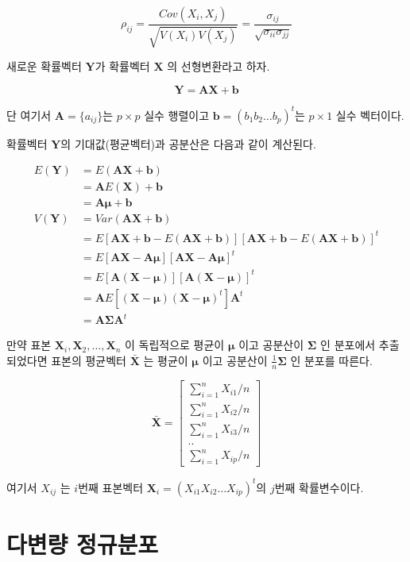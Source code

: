 \documentclass[
  11pt,
  a4paper,
  oneside]{scrbook}
\theoremstyle{definition}
\theoremstyle{plain}
\theoremstyle{definition}
\theoremstyle{definition}
\theoremstyle{remark}
\begin{document}
\[ \rho_{ij} = \frac{Cov(X_i, X_j)}{ \sqrt{V(X_i) V(X_j)}} = \frac{\sigma_{ij}}{\sqrt{\sigma_{ii}
  \sigma_{jj}}} \]

새로운 확률벡터 \(\pmb Y\)가 확률벡터 \(\pmb X\) 의 선형변환라고 하자.

\[ \pmb Y = \pmb A  \pmb X + \pmb b \]

단 여기서 \(\pmb A = \{ a_{ij} \}\)는 \(p \times p\) 실수 행렬이고
\(\pmb b =(b_1 b_2 \dots b_p)^t\)는 \(p \times 1\) 실수 벡터이다.

확률벡터 \(\pmb Y\)의 기대값(평균벡터)과 공분산은 다음과 같이 계산된다.

\[
\begin{align}
E(\pmb Y ) &= E(\pmb A \pmb X+ \pmb b) \\
&= \pmb A E(\pmb X)+ \pmb b \\
&= \pmb A \pmb \mu+ \pmb b \\
V(\pmb Y) &= Var(\pmb A \pmb X+ \pmb b) \\
&= E[\pmb A \pmb X+ \pmb b -E(\pmb A \pmb X+ \pmb b)] [\pmb A \pmb X+ \pmb b -E(\pmb A \pmb X+ \pmb b)]^t \\
&= E[\pmb A \pmb X -  \pmb A \pmb \mu] [\pmb A \pmb X -  \pmb A \pmb \mu]^t \\
&= E[\pmb A (\pmb X - \pmb \mu)] [\pmb A (\pmb X - \pmb \mu)]^t \\
&= \pmb A E [(\pmb X - \pmb \mu) (\pmb X - \pmb \mu)^t] \pmb A^t \\
&= \pmb A \pmb \Sigma \pmb A^t
\end{align}
\]

만약 표본 \(\pmb X_i, \pmb X_2, \dots, \pmb X_n\) 이 독립적으로 평균이
\(\pmb \mu\) 이고 공분산이 \(\pmb \Sigma\) 인 분포에서 추출되었다면
표본의 평균벡터 \(\bar {\pmb  X}\) 는 평균이 \(\pmb \mu\) 이고 공분산이
\(\frac{1}{n}\pmb \Sigma\) 인 분포를 따른다.

\[
\bar {\pmb X} =
  \begin{bmatrix}
\sum_{i=1}^n X_{i1} / n  \\
\sum_{i=1}^n X_{i2} / n \\
\sum_{i=1}^n X_{i3} / n \\
..  \\
\sum_{i=1}^n X_{ip} / n 
\end{bmatrix}
\]

여기서 \(X_{ij}\) 는 \(i\)번째 표본벡터
\(\pmb X_i =(X_{i1} X_{i2} \dots X_{ip})^t\)의 \(j\)번째 확률변수이다.

\section{다변량
정규분포}\label{uxb2e4uxbcc0uxb7c9-uxc815uxaddcuxbd84uxd3ec}
\end{document}
